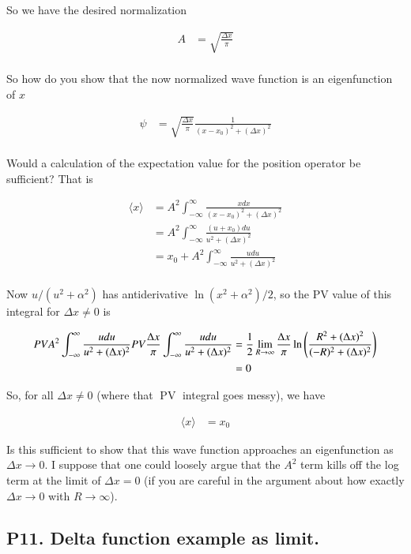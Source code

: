 \documentclass{article}
\newcommand{\expectation}[1]{\langle{#1}\rangle}
\newcommand{\IIinf}[0]{ \int_{-\infty}^\infty }
\DeclareMathOperator{\PV}{PV}
\begin{document}
So we have the desired normalization

\begin{align*}
A &= \sqrt{\frac{\Delta x}{\pi}} \\
\end{align*}

So how do you show that the now normalized wave function is an eigenfunction of $x$ 

\begin{align*}
\psi &= \sqrt{\frac{\Delta x}{\pi}} \frac{1}{(x-x_0)^2 + (\Delta x)^2} \\
\end{align*}

Would a calculation of the expectation value for the position operator be sufficient?  That is

\begin{align*}
\expectation{x} 
&= A^2 \IIinf \frac{x dx }{(x-x_0)^2 + (\Delta x)^2} \\
&= A^2 \IIinf \frac{(u + x_0) du }{u^2 + (\Delta x)^2} \\
&= x_0 + A^2 \IIinf \frac{u du }{u^2 + (\Delta x)^2} \\
\end{align*}

Now $u/(u^2 + \alpha^2)$ has antiderivative $\ln(x^2 + \alpha^2)/2$, so the PV value of this integral for $\Delta x \ne 0$
is

\begin{align*}
PV A^2 \IIinf \frac{u du }{u^2 + (\Delta x)^2} 
PV \frac{\Delta x}{\pi} \IIinf \frac{u du }{u^2 + (\Delta x)^2} 
&= \inv{2} \lim_{R\rightarrow \infty} \frac{\Delta x}{\pi} \ln\left( \frac{R^2 + (\Delta x)^2}{(-R)^2 + (\Delta x)^2} \right) \\
&= 0
\end{align*}

So, for all $\Delta x \ne 0$ (where that $\PV$ integral goes messy), we have

\begin{align*}
\expectation{x} &= x_0 
\end{align*}

Is this sufficient to show that this wave function approaches an eigenfunction as $\Delta x \rightarrow 0$.
I suppose that one could loosely argue that the $A^2$ term kills off the log term at the limit of $\Delta x = 0$ (if you are careful in the argument about how exactly $\Delta x \rightarrow 0$ with $R \rightarrow \infty$).

\subsection{ P11. Delta function example as limit. }
\end{document}
